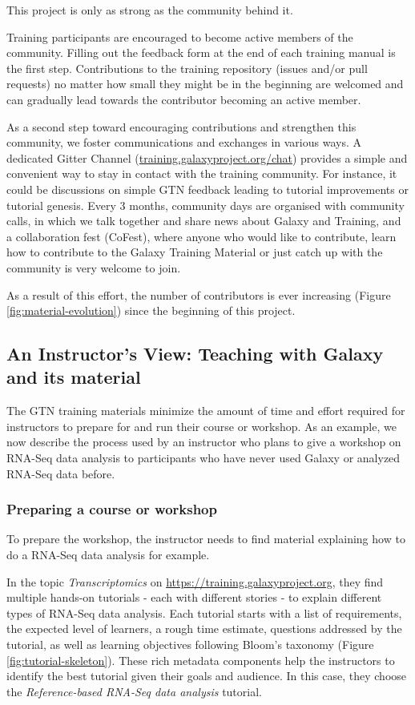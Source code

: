 \documentclass[10pt,letterpaper]{article}
\begin{document}
This project is only as strong as the community behind it.

Training participants are encouraged to become active members of the community. Filling out the feedback form at the end of each training manual is the first step. Contributions to the training repository (issues and/or pull requests) no matter how small they might be in the beginning are welcomed and can gradually lead towards the contributor becoming an active member. 

As a second step toward encouraging contributions and strengthen this community, we foster communications and exchanges in various ways. A dedicated Gitter Channel (\url{training.galaxyproject.org/chat}) provides a simple and convenient way to stay in contact with the training community. For instance, it could be discussions on simple GTN feedback leading to tutorial improvements or tutorial genesis. Every 3 months, community days are organised with community calls, in which we talk together and share news about Galaxy and Training, and a collaboration fest (CoFest), where anyone who would like to contribute, learn how to contribute to the Galaxy Training Material or just catch up with the community is very welcome to join.

As a result of this effort, the number of contributors is ever increasing (Figure \ref{fig:material-evolution}) since the beginning of this project.

\subsection*{An Instructor's View: Teaching with Galaxy and its material}

The GTN training materials minimize the amount of time and effort required for instructors to prepare for and run their course or workshop. As an example, we now describe the process used by an instructor who plans to give a workshop on RNA-Seq data analysis to participants who have never used Galaxy or analyzed RNA-Seq data before.

\subsubsection*{Preparing a course or workshop}

To prepare the workshop, the instructor needs to find material explaining how to do a RNA-Seq data analysis for example.

In the topic \emph{Transcriptomics} on \url{https://training.galaxyproject.org}, they find multiple hands-on tutorials - each with different stories - to explain different types of RNA-Seq data analysis. Each tutorial starts with a list of requirements, the expected level of learners, a rough time estimate, questions addressed by the tutorial, as well as learning objectives following Bloom’s taxonomy \cite{Bloom1956} (Figure \ref{fig:tutorial-skeleton}).
These rich metadata components help the instructors to identify the best tutorial given their goals and audience. In this case, they choose the \emph{Reference-based RNA-Seq data analysis} tutorial.
\end{document}
